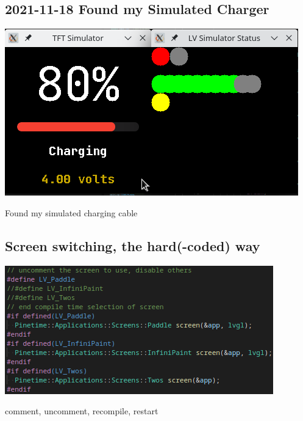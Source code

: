 \documentclass{beamer}
\begin{document}
\subsection{2021-11-18 Found my Simulated Charger}
\begin{frame}{}
  \centering\includegraphics[width=\textwidth]{../2021-11-18_BatteryInfo_charging.png}

  Found my simulated charging cable
\end{frame}

\subsection{Screen switching, the hard(-coded) way}
\begin{frame}{}
  \centering\includegraphics[width=\textwidth]{../switching_screens_hard_coded}

  comment, uncomment, recompile, restart
\end{frame}
\end{document}
